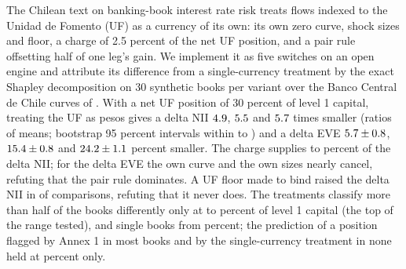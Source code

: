 The Chilean text on banking-book interest rate risk treats flows indexed to the Unidad de Fomento (UF) as a currency of its own: its own zero curve, shock sizes and floor, a charge of 2.5 percent of the net UF position, and a pair rule offsetting half of one leg's gain. We implement it as five switches on an open engine and attribute its difference from a single-currency treatment by the exact Shapley decomposition on 30 synthetic books per variant over the Banco Central de Chile curves of \valDate{}. With a net UF position of 30 percent of level 1 capital, treating the UF as pesos gives a delta NII $4.9$, $5.5$ and $5.7$ times smaller (ratios of means; bootstrap 95 percent intervals within \rmLoLng{} to \rmHiOff{}) and a delta EVE $5.7\pm0.8$, $15.4\pm0.8$ and $24.2\pm1.1$ percent smaller. The charge supplies \mainChargeShareLo{} to \mainChargeShareHi{} percent of the delta NII; for the delta EVE the own curve and the own sizes nearly cancel, refuting that the pair rule dominates. A UF floor made to bind raised the delta NII in \floorsRaise{} of \floorsTotalNii{} comparisons, refuting that it never does. The treatments classify more than half of the books differently only at \sweepMajLo{} to \sweepMajHi{} percent of level 1 capital (the top of the range tested), and single books from \sweepFirstDiff{} percent; the prediction of a position flagged by Annex 1 in most books and by the single-currency treatment in none held at \hFourLo{} percent only.
